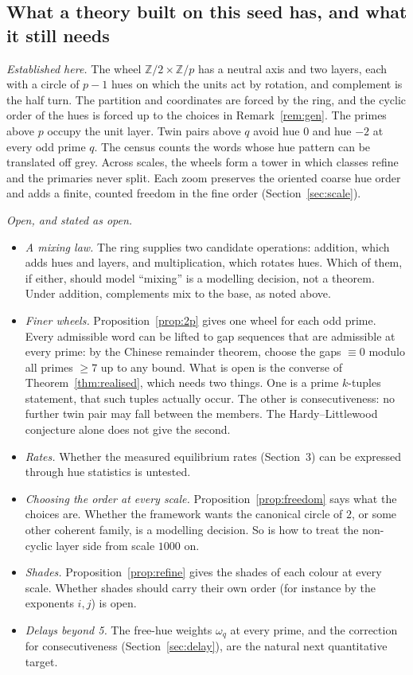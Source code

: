 \documentclass[11pt]{article}
\newcommand{\Z}{\mathbb Z}
\theoremstyle{plain}
\theoremstyle{definition}
\theoremstyle{remark}
\begin{document}
\subsection{What a theory built on this seed has, and what it still needs}

\emph{Established here.} The wheel $\Z/2\times\Z/p$ has a neutral axis and two layers, each with a
circle of $p-1$ hues on which the units act by rotation, and complement is the half turn. The
partition and coordinates are forced by the ring, and the cyclic order of the hues is forced up to
the choices in Remark~\ref{rem:gen}. The primes above $p$ occupy the unit layer. Twin pairs above
$q$ avoid hue $0$ and hue $-2$ at every odd prime $q$. The census counts the words whose hue pattern
can be translated off grey. Across scales, the wheels form a tower in which classes refine and the
primaries never split. Each zoom preserves the oriented coarse hue order and adds a finite, counted
freedom in the fine order (Section~\ref{sec:scale}).

\emph{Open, and stated as open.}
\begin{itemize}[nosep]
\item[(i)] \emph{A mixing law.} The ring supplies two candidate operations: addition, which adds hues
and layers, and multiplication, which rotates hues. Which of them, if either, should model
``mixing'' is a modelling decision, not a theorem. Under addition, complements mix to the base, as
noted above.
\item[(ii)] \emph{Finer wheels.} Proposition~\ref{prop:2p} gives one wheel for each odd prime. Every
admissible word can be lifted to gap sequences that are admissible at every prime: by the Chinese
remainder theorem, choose the gaps $\equiv0$ modulo all primes $\ge7$ up to any bound. What is open
is the converse of Theorem~\ref{thm:realised}, which needs two things. One is a prime $k$-tuples
statement, that such tuples actually occur. The other is consecutiveness: no further twin pair may
fall between the members. The Hardy--Littlewood conjecture alone does not give the second.
\item[(iii)] \emph{Rates.} Whether the measured equilibrium rates (Section~3) can be expressed
through hue statistics is untested.
\item[(iv)] \emph{Choosing the order at every scale.} Proposition~\ref{prop:freedom} says what the
choices are. Whether the framework wants the canonical circle of $2$, or some other coherent family,
is a modelling decision. So is how to treat the non-cyclic layer side from scale $1000$ on.
\item[(v)] \emph{Shades.} Proposition~\ref{prop:refine} gives the shades of each colour at every
scale. Whether shades should carry their own order (for instance by the exponents $i,j$) is open.
\item[(vi)] \emph{Delays beyond 5.} The free-hue weights $\omega_q$ at every prime, and the
correction for consecutiveness (Section~\ref{sec:delay}), are the natural next quantitative target.
\end{itemize}
\end{document}
